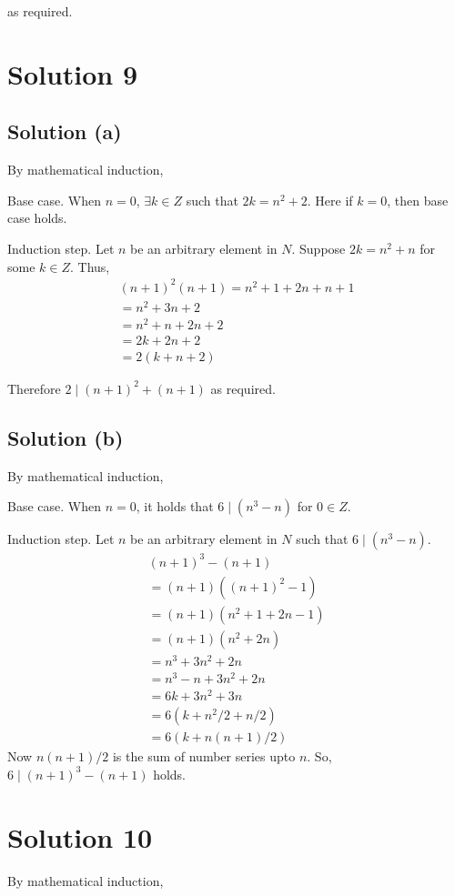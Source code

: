 \documentclass{article}
\begin{document}
  as required.

\section{Solution 9}
\subsection{Solution (a)}
By mathematical induction,

Base case. When $n = 0$, $\exists k \in Z$ such that $2k = n^2 + 2$.
Here if $k = 0$, then base case holds.

Induction step. Let $n$ be an arbitrary element in $N$. Suppose $2k =
n^2 + n$ for some $k \in Z$. Thus,
\begin{align*}
  (n + 1)^2 (n + 1) = n^2 + 1 + 2n + n + 1 \\
  = n^2 + 3n + 2 \\
  = n^2 + n + 2n + 2 \\
  = 2k + 2n + 2 \\
  = 2(k + n + 2)
\end{align*}

Therefore $2 \mid (n+1)^2 + (n+1)$ as required.

\subsection{Solution (b)}
By mathematical induction,

Base case. When $ n = 0$, it holds that $6 \mid (n^3 - n)$ for $0 \in
Z$.

Induction step. Let $n$ be an arbitrary element in $N$ such that $6
\mid (n^3 - n)$.
\begin{align*}
  (n+1)^3 - (n+1) \\
  = (n+1)((n+1)^2 - 1) \\
  = (n+1)(n^2 + 1 + 2n - 1) \\
  = (n+1)(n^2 + 2n) \\
  = n^3 + 3n^2 + 2n \\
  = n^3 - n + 3n^2 + 2n \\
  = 6k + 3n^2 + 3n \\
  = 6(k + n^2/2 + n/2) \\
  = 6(k + n(n+1)/2)
\end{align*}
Now $n(n+1)/2$ is the sum of number series upto $n$. So, $6 \mid
(n+1)^3 - (n+1)$ holds.

\section{Solution 10}
By mathematical induction,
\end{document}

